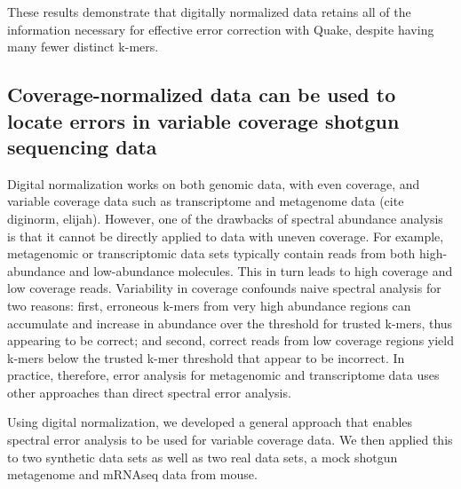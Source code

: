 \documentclass{article}
\begin{document}
These results demonstrate that digitally normalized data retains all
of the information necessary for effective error correction with
Quake, despite having many fewer distinct k-mers.

%

\subsection{Coverage-normalized data can be used to locate errors in variable
coverage shotgun sequencing data}

Digital normalization works on both genomic data, with even coverage,
and variable coverage data such as transcriptome and metagenome data
(cite diginorm, elijah).  However, one of the drawbacks of spectral
abundance analysis is that it cannot be directly applied to data with
uneven coverage.  For example, metagenomic or transcriptomic data sets
typically contain reads from both high-abundance and low-abundance
molecules.  This in turn leads to high coverage and low coverage
reads. Variability in coverage confounds naive spectral analysis
for two reasons: first, erroneous k-mers from very high abundance
regions can accumulate and increase in abundance over the threshold
for trusted k-mers, thus appearing to be correct; and second, correct
reads from low coverage regions yield k-mers below the trusted k-mer
threshold that appear to be incorrect.  In practice, therefore, error
analysis for metagenomic and transcriptome data uses other approaches
than direct spectral error analysis.

Using digital normalization, we developed a general approach that
enables spectral error analysis to be used for variable coverage
data.  We then applied this to two synthetic data sets as well as two
real data sets, a mock shotgun metagenome and mRNAseq data from
mouse.
\end{document}
